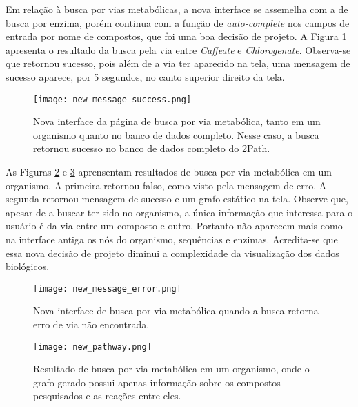 \indent Em relação à busca por vias metabólicas, a nova interface se assemelha com a de busca por enzima, porém continua com a função de \textit{auto-complete} nos campos de entrada por nome de compostos, que foi uma boa decisão de projeto. A Figura \ref{fig:new_message_success} apresenta o resultado da busca pela via entre \textit{Caffeate} e \textit{Chlorogenate}. Observa-se que retornou sucesso, pois além de a via ter aparecido na tela, uma mensagem de sucesso aparece, por 5 segundos, no canto superior direito da tela.

\begin{figure}[!h]
    \centering
    \texttt{[image: new\_message\_success.png]}
    \caption{Nova interface da página de busca por via metabólica, tanto em um organismo quanto no banco de dados completo. Nesse caso, a busca retornou sucesso no banco de dados completo do 2Path.}
    \label{fig:new_message_success}
\end{figure}

\indent As Figuras \ref{fig:new_message_error} e \ref{fig:new_pathway} aprensentam resultados de busca por via metabólica em um organismo. A primeira retornou falso, como visto pela mensagem de erro. A segunda retornou mensagem de sucesso e um grafo estático na tela. Observe que, apesar de a buscar ter sido no organismo, a única informação que interessa para o usuário é da via entre um composto e outro. Portanto não aparecem mais como na interface antiga os nós do organismo, sequências e enzimas. Acredita-se que essa nova decisão de projeto diminui a complexidade da visualização dos dados biológicos.

\begin{figure}[!h]
    \centering
    \texttt{[image: new\_message\_error.png]}
    \caption{Nova interface de busca por via metabólica quando a busca retorna erro de via não encontrada.}
    \label{fig:new_message_error}
\end{figure}

\newpage
\begin{figure}[!t]
    \centering
    \texttt{[image: new\_pathway.png]}
    \caption{Resultado de busca por via metabólica em um organismo, onde o grafo gerado possui apenas informação sobre os compostos pesquisados e as reações entre eles.}
    \label{fig:new_pathway}
\end{figure}




